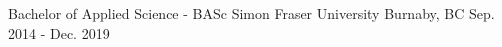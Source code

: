 

\begin{cventries}

  \cventry
    {Bachelor of Applied Science - BASc} %
    {Simon Fraser University} %
    {Burnaby, BC} %
    {Sep. 2014 - Dec. 2019} %
    {}
\end{cventries}
